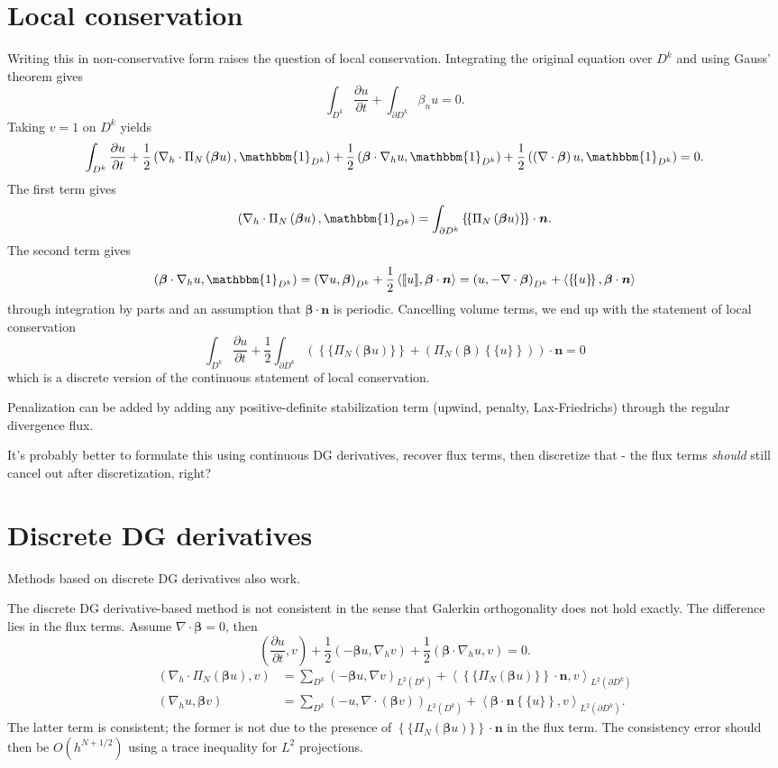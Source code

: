 \documentclass[preprint,10pt]{article}
\newcommand{\bbm}[1]{\mathbbm{#1}}
\newcommand{\pd}[2]{\frac{\partial#1}{\partial#2}}
\newcommand{\LRp}[1]{\left( #1 \right)}
\newcommand{\LRa}[1]{\left\langle #1 \right\rangle}
\newcommand{\LRc}[1]{\left\{ #1 \right\}}
\newcommand{\Grad} {\ensuremath{\nabla}}
\newcommand{\Div} {\ensuremath{\nabla\cdot}}
\newcommand{\jump}[1] {\ensuremath{\llbracket#1\rrbracket}}
\newcommand{\avg}[1] {\ensuremath{\LRc{\!\{#1\}\!}}}
\newcommand{\LK}{L^2\LRp{D^k}}
\newcommand{\LdK}{L^2\LRp{\partial D^k}}
\begin{document}
\section{Local conservation}

Writing this in non-conservative form raises the question of local conservation.  Integrating the original equation over $D^k$ and using Gauss' theorem gives
\[
\int_{D^k}\pd{u}{t} + \int_{\partial D^k} \beta_n u = 0.
\]
Taking $v = 1$ on $D^k$ yields
\[
\int_{D^k}\pd{u}{t} + \frac{1}{2}\LRp{\Grad_h\cdot \Pi_N \LRp{ \bm{\beta}u},\bbm{1}_{D^k}} + \frac{1}{2}\LRp{\bm{\beta}\cdot\Grad_h u,\bbm{1}_{D^k}} + \frac{1}{2}\LRp{\LRp{\Grad\cdot \bm{\beta}} u,\bbm{1}_{D^k}} = 0.
\]
The first term gives
\[
\LRp{\Grad_h\cdot \Pi_N \LRp{ \bm{\beta}u},\bbm{1}_{D^k}} = \int_{\partial D^k} \avg{\Pi_N\LRp{\bm{\beta}u}}\cdot\bm{n}.
\]
The second term gives
\[
\LRp{\bm{\beta}\cdot\Grad_h u,\bbm{1}_{D^k}} = \LRp{\Grad u,\bm{\beta}}_{D^k} + \frac{1}{2}\LRa{\jump{u},\bm{\beta}\cdot\bm{n}} = \LRp{u,-\Grad \cdot \bm{\beta}}_{D^k} + \LRa{\avg{u},\bm{\beta}\cdot\bm{n}}
\]
through integration by parts and an assumption that $\bm{\beta}\cdot \bm{n}$ is periodic.  Cancelling volume terms, we end up with the statement of local conservation 
\[
\int_{D^k} \pd{u}{t}  + \frac{1}{2}\int_{\partial D^k} \LRp{\avg{\Pi_N\LRp{\bm{\beta}u}} + \LRp{\Pi_N\LRp{\bm{\beta}}\avg{u}}}\cdot\bm{n} = 0
\]
which is a discrete version of the continuous statement of local conservation.

Penalization can be added by adding any positive-definite stabilization term (upwind, penalty, Lax-Friedrichs) through the regular divergence flux.  

It's probably better to formulate this using continuous DG derivatives, recover flux terms, then discretize that - the flux terms \textit{should} still cancel out after discretization, right?


\section{Discrete DG derivatives}

Methods based on discrete DG derivatives also work.  

The discrete DG derivative-based method is not consistent in the sense that Galerkin orthogonality does not hold exactly.  The difference lies in the flux terms.  Assume $\Div \bm{\beta} = 0$, then
\[
\LRp{\pd{u}{t},v} + \frac{1}{2}\LRp{-{ \bm{\beta}u},\Grad_h v} + \frac{1}{2}\LRp{\bm{\beta}\cdot\Grad_h u,v} = 0.
\]
\begin{align*}
\LRp{\Grad_h\cdot \Pi_N\LRp{ \bm{\beta}u},v} &= \sum_{D^k} \LRp{-\bm{\beta}u, \Grad v}_{\LK} + \LRa{\avg{\Pi_N\LRp{\bm{\beta} u}}\cdot \bm{n},v}_{\LdK}\\
\LRp{\Grad_h u,\bm{\beta}v} &= \sum_{D^k} \LRp{-u, \Grad \cdot \LRp{\bm{\beta}v}}_{\LK} + \LRa{\bm{\beta}\cdot\bm{n}\avg{u},v}_{\LdK}.
\end{align*}
The latter term is consistent; the former is not due to the presence of $\avg{\Pi_N\LRp{\bm{\beta} u}}\cdot \bm{n}$ in the flux term.  The consistency error should then be $O(h^{N+1/2})$ using a trace inequality for $L^2$ projections.  
\end{document}
